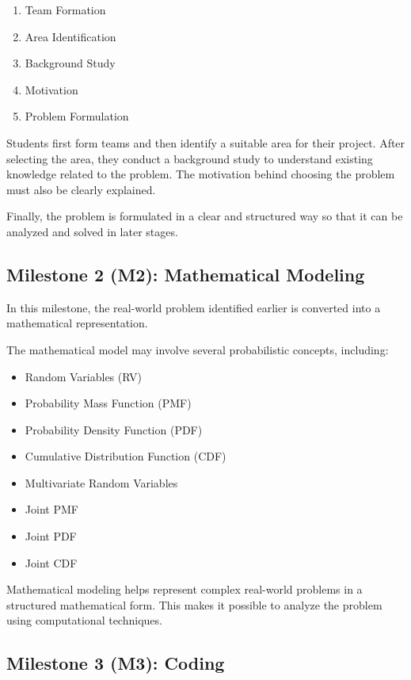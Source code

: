 \documentclass[12pt,a4paper]{article}
\begin{document}
\begin{enumerate}
\item Team Formation
\item Area Identification
\item Background Study
\item Motivation
\item Problem Formulation
\end{enumerate}

Students first form teams and then identify a suitable area for their project. After selecting the area, they conduct a background study to understand existing knowledge related to the problem. The motivation behind choosing the problem must also be clearly explained.

Finally, the problem is formulated in a clear and structured way so that it can be analyzed and solved in later stages.

\subsection{Milestone 2 (M2): Mathematical Modeling}

In this milestone, the real-world problem identified earlier is converted into a mathematical representation.

The mathematical model may involve several probabilistic concepts, including:

\begin{itemize}
\item Random Variables (RV)
\item Probability Mass Function (PMF)
\item Probability Density Function (PDF)
\item Cumulative Distribution Function (CDF)
\item Multivariate Random Variables
\item Joint PMF
\item Joint PDF
\item Joint CDF
\end{itemize}

Mathematical modeling helps represent complex real-world problems in a structured mathematical form. This makes it possible to analyze the problem using computational techniques.

\subsection{Milestone 3 (M3): Coding}
\end{document}
